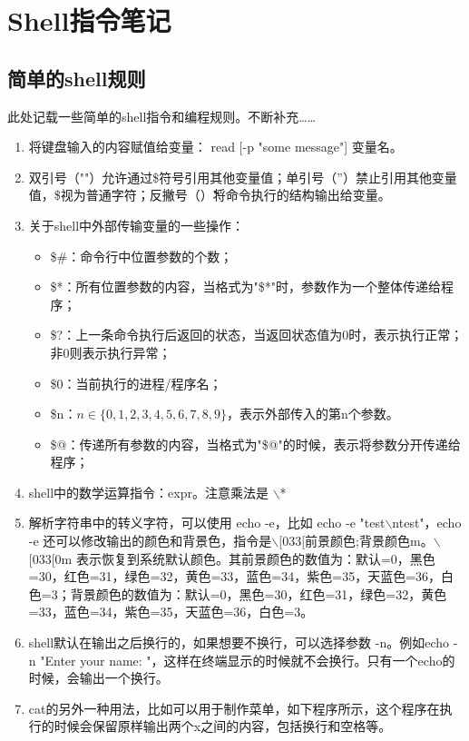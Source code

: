 \section{Shell指令笔记}

\subsection{简单的shell规则}
此处记载一些简单的shell指令和编程规则。不断补充……
\begin{enumerate}
  \item 将键盘输入的内容赋值给变量： read [-p "some message"] 变量名。
  \item 双引号（""）允许通过\$符号引用其他变量值；单引号（''）禁止引用其他变量值，\$视为普通字符；反撇号（\`\`）将命令执行的结构输出给变量。
  \item 关于shell中外部传输变量的一些操作：
    \begin{itemize}
      \item \$\#：命令行中位置参数的个数；
      \item \$*：所有位置参数的内容，当格式为"\$*"时，参数作为一个整体传递给程序；
      \item \$?：上一条命令执行后返回的状态，当返回状态值为0时，表示执行正常；非0则表示执行异常；
      \item \$0：当前执行的进程/程序名；
      \item \$n：$n\in\{0,1,2,3,4,5,6,7,8,9\}$，表示外部传入的第n个参数。
      \item \$@：传递所有参数的内容，当格式为"\$@"的时候，表示将参数分开传递给程序；
    \end{itemize}
  \item shell中的数学运算指令：expr。注意乘法是 $\backslash$*
  \item 解析字符串中的转义字符，可以使用 echo -e，比如 echo -e "test$\backslash$ntest"，echo -e 还可以修改输出的颜色和背景色，指令是$\backslash$[033[前景颜色;背景颜色m。$\backslash$[033[0m 表示恢复到系统默认颜色。其前景颜色的数值为：默认=0，黑色=30，红色=31，绿色=32，黄色=33，蓝色=34，紫色=35，天蓝色=36，白色=3；背景颜色的数值为：默认=0，黑色=30，红色=31，绿色=32，黄色=33，蓝色=34，紫色=35，天蓝色=36，白色=3。
  \item shell默认在输出之后换行的，如果想要不换行，可以选择参数 -n。例如echo -n "Enter your name: "，这样在终端显示的时候就不会换行。只有一个echo的时候，会输出一个换行。
  \item cat的另外一种用法，比如可以用于制作菜单，如下程序所示，这个程序在执行的时候会保留原样输出两个x之间的内容，包括换行和空格等。

\end{enumerate}

